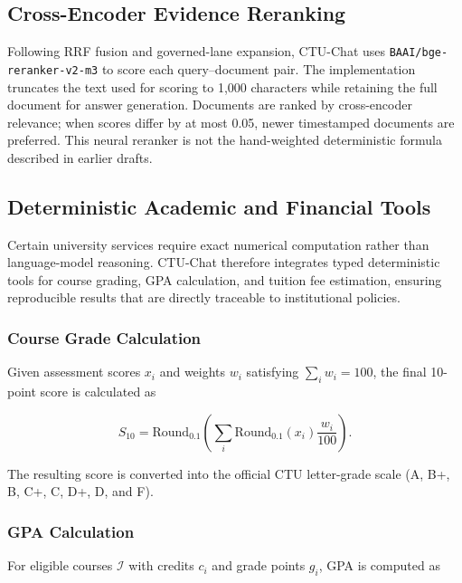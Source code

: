 \subsection{Cross-Encoder Evidence Reranking}

Following RRF fusion and governed-lane expansion, CTU-Chat uses
\nolinkurl{BAAI/bge-reranker-v2-m3} to score each query--document pair. The
implementation truncates the text used for scoring to 1,000 characters while
retaining the full document for answer generation. Documents are ranked by
cross-encoder relevance; when scores differ by at most 0.05, newer timestamped
documents are preferred. This neural reranker is not the hand-weighted
deterministic formula described in earlier drafts.

\subsection{Deterministic Academic and Financial Tools}

Certain university services require exact numerical computation rather than language-model reasoning. CTU-Chat therefore integrates typed deterministic tools for course grading, GPA calculation, and tuition fee estimation, ensuring reproducible results that are directly traceable to institutional policies.

\subsubsection{Course Grade Calculation}

Given assessment scores $x_i$ and weights $w_i$ satisfying $\sum_i w_i=100$, the final 10-point score is calculated as

\begin{equation}
  S_{10}
  =\mathrm{Round}_{0.1}\!\left(
     \sum_i
     \mathrm{Round}_{0.1}(x_i)
     \frac{w_i}{100}
   \right).
\label{eq:grade}
\end{equation}

The resulting score is converted into the official CTU letter-grade scale (A, B+, B, C+, C, D+, D, and F).

\subsubsection{GPA Calculation}

For eligible courses $\mathcal{I}$ with credits $c_i$ and grade points $g_i$, GPA is computed as

